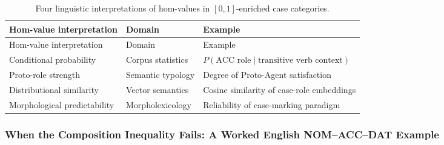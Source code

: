 \documentclass[
]{article}
\begin{document}
\begin{longtable}[]{@{}
  >{\raggedright\arraybackslash}p{}
  >{\raggedright\arraybackslash}p{}
  >{\raggedright\arraybackslash}p{}@{}}
\caption{Four linguistic interpretations of hom-values in
\([0,1]\)-enriched case
categories.}\label{tbl:hom-value-interpretations}\tabularnewline
\toprule\noalign{}
\begin{minipage}[b]{\linewidth}\raggedright
Hom-value interpretation
\end{minipage} & \begin{minipage}[b]{\linewidth}\raggedright
Domain
\end{minipage} & \begin{minipage}[b]{\linewidth}\raggedright
Example
\end{minipage} \\
\midrule\noalign{}
\endfirsthead
\toprule\noalign{}
\begin{minipage}[b]{\linewidth}\raggedright
Hom-value interpretation
\end{minipage} & \begin{minipage}[b]{\linewidth}\raggedright
Domain
\end{minipage} & \begin{minipage}[b]{\linewidth}\raggedright
Example
\end{minipage} \\
\midrule\noalign{}
\endhead
\bottomrule\noalign{}
\endlastfoot
Conditional probability & Corpus statistics &
\(P(\text{ACC role} \mid \text{transitive verb context})\) \\
Proto-role strength & Semantic typology & Degree of Proto-Agent
satisfaction \\
Distributional similarity & Vector semantics & Cosine similarity of
case-role embeddings \\
Morphological predictability & Morpholexicology & Reliability of
case-marking paradigm \\
\end{longtable}

\subsubsection{When the Composition Inequality Fails: A Worked English
NOM--ACC--DAT
Example}\label{when-the-composition-inequality-fails-a-worked-english-nomaccdat-example}
\end{document}
